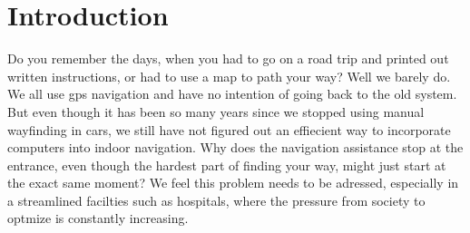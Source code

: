 \chapter{Introduction}

Do you remember the days, when you had to go on a road trip and printed out written instructions, or had to use a map to path your way? Well we barely do. We all use gps navigation and have no intention of going back to the old system. But even though it has been so many years since we stopped using manual wayfinding in cars, we still have not figured out an effiecient way to incorporate computers into indoor navigation. Why does the navigation assistance stop at the entrance, even though the hardest part of finding your way, might just start at the exact same moment? We feel this problem needs to be adressed, especially in a streamlined facilties such as hospitals, where the pressure from society to optmize is constantly increasing.